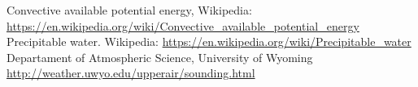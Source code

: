 \documentclass[12pt,letterpaper]{article}
\begin{document}
\begin{thebibliography}{2}
 Convective available potential energy, Wikipedia: \url{https://en.wikipedia.org/wiki/Convective_available_potential_energy}
 Precipitable water. Wikipedia: \url{https://en.wikipedia.org/wiki/Precipitable_water}
 Departament of Atmospheric Science, University of Wyoming \url{http://weather.uwyo.edu/upperair/sounding.html}

\end{thebibliography}
\end{document}
